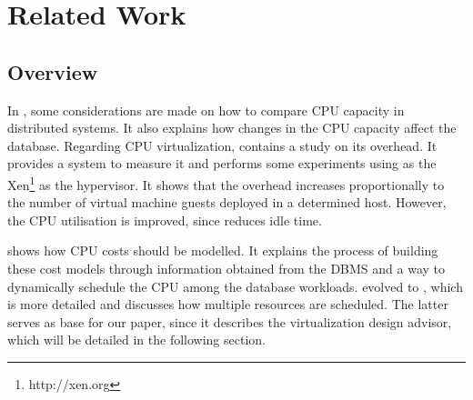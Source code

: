 \chapter{Related Work}

\label{chap:relwork}


\section{Overview}



In \cite{dias:automatic}, some considerations are made on how to compare CPU capacity in distributed systems. It also explains how changes in the CPU capacity affect the database. Regarding CPU virtualization, \cite{6127969} contains a study on its overhead. It provides a system to measure it and performs some experiments using as the Xen\footnote{http://xen.org} as the hypervisor. It shows that the overhead increases proportionally to the number of virtual machine guests deployed in a determined host. However, the CPU utilisation is improved, since reduces idle time. 

\cite{Soror:2008:AVM:1376616.1376711-OLD} shows how CPU costs should be modelled. It explains the process of building these cost models through information obtained from the DBMS and a way to dynamically schedule the CPU among the database workloads. \cite{Soror:2008:AVM:1376616.1376711-OLD} evolved to \cite{Soror:2008:AVM:1376616.1376711}, which is more detailed and discusses how multiple resources are scheduled. The latter serves as base for our paper, since it describes the virtualization design advisor, which will be detailed in the following section.

